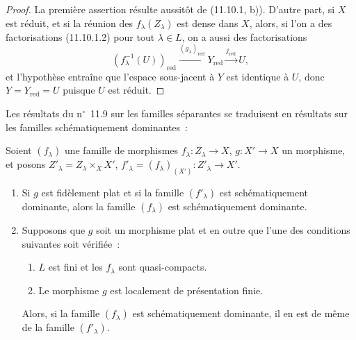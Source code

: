 \begin{proof}
La première assertion résulte aussitôt de (11.10.1, b)). D'autre part, si $X$
est réduit, et si la réunion des $f_\lambda(Z_\lambda)$ est dense dans $X$,
alors, si l'on a des factorisations (11.10.1.2) pour tout $\lambda\in L$, on a
aussi des factorisations
\[
(f_\lambda^{-1}(U))_{\mathrm{red}}
\xrightarrow{(g_\lambda)_{\mathrm{red}}}Y_{\mathrm{red}}
\xrightarrow{j_{\mathrm{red}}}U,
\]
et l'hypothèse entraîne que l'espace sous-jacent à $Y$ est identique à $U$,
donc $Y=Y_{\mathrm{red}}=U$ puisque $U$ est réduit.
\end{proof}

Les résultats du n$^\circ$~11.9 sur les familles séparantes se traduisent en
résultats sur les familles schématiquement dominantes~:

\begin{theorem}[11.10.5]
\label{IV.11.10.5-fr}
Soient $(f_\lambda)$ une famille de morphismes
$f_\lambda:Z_\lambda\to X$, $g:X'\to X$ un morphisme, et posons
$Z'_\lambda=Z_\lambda\times_XX'$,
$f'_\lambda=(f_\lambda)_{(X')}:Z'_\lambda\to X'$.
\begin{enumerate}[label=(\roman*)]
  \item Si $g$ est fidèlement plat et si la famille $(f'_\lambda)$ est
  schématiquement dominante, alors la famille $(f_\lambda)$ est
  schématiquement dominante.
  \item Supposons que $g$ soit un morphisme plat et en outre que l'une des
  conditions suivantes soit vérifiée~:
  \begin{enumerate}[label=\emph{\alph*)}]
    \item $L$ est fini et les $f_\lambda$ sont quasi-compacts.
    \item Le morphisme $g$ est localement de présentation finie.
  \end{enumerate}
  Alors, si la famille $(f_\lambda)$ est schématiquement dominante, il en est
  de même de la famille $(f'_\lambda)$.
\end{enumerate}
\end{theorem}

